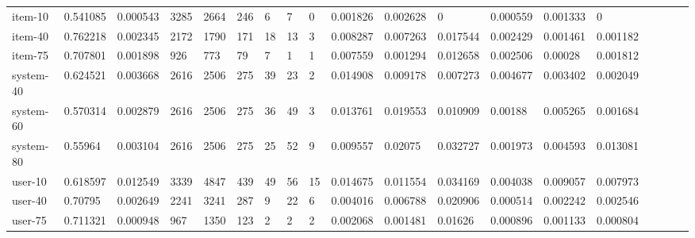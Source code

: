 \begin{table}
{\begin{tabular}{*{19}l}
item-10		&	0.541085 &	0.000543 &	3285 &	2664 &	246 &	6 &	7 &	0 &	0.001826 &	0.002628 &	0 &	0.000559 &	0.001333 &	0 &	 \\
item-40		&	0.762218 &	0.002345 &	2172 &	1790 &	171 &	18 &	13 &	3 &	0.008287 &	0.007263 &	0.017544 &	0.002429 &	0.001461 &	0.001182 &	 \\
item-75		&	0.707801 &	0.001898 &	926 &	773 &	79 &	7 &	1 &	1 &	0.007559 &	0.001294 &	0.012658 &	0.002506 &	0.00028 &	0.001812 &	 \\
system-40	&	0.624521 &	0.003668 &	2616 &	2506 &	275 &	39 &	23 &	2 &	0.014908 &	0.009178 &	0.007273 &	0.004677 &	0.003402 &	0.002049 &	 \\
system-60	&	0.570314 &	0.002879 &	2616 &	2506 &	275 &	36 &	49 &	3 &	0.013761 &	0.019553 &	0.010909 &	0.00188 &	0.005265 &	0.001684 &	 \\
system-80	&	0.55964  &	0.003104 &	2616 &	2506 &	275 &	25 &	52 &	9 &	0.009557 &	0.02075 &	0.032727 &	0.001973 &	0.004593 &	0.013081 &	 \\
user-10		&	0.618597 &	0.012549 &	3339 &	4847 &	439 &	49 &	56 &	15 &	0.014675 &	0.011554 &	0.034169 &	0.004038 &	0.009057 &	0.007973 &	 \\
user-40		&	0.70795  &	0.002649 &	2241 &	3241 &	287 &	9 &	22 &	6 &	0.004016 &	0.006788 &	0.020906 &	0.000514 &	0.002242 &	0.002546 &	 \\
user-75		&	0.711321 &	0.000948 &	967 &	1350 &	123 &	2 &	2 &	2 &	0.002068 &	0.001481 &	0.01626 &	0.000896 &	0.001133 &	0.000804 &	 \\




\end{tabular}}
\end{table}
